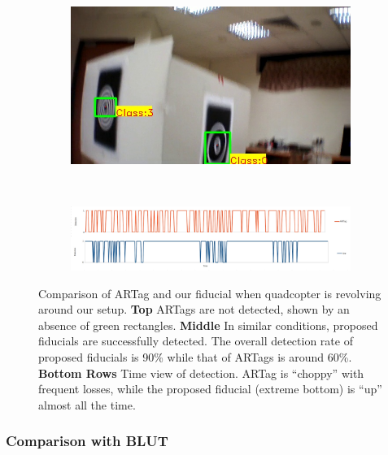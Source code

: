 \begin{figure}[hb!]
\begin{subfigure}[b]{.19\textwidth}
\end{subfigure}
\begin{subfigure}[b]{.19\textwidth}
\includegraphics[width=\linewidth]{figures/fiducial/setup_our/output_6/output_943.jpg}
\end{subfigure}\\
\begin{subfigure}[b]{\textwidth}
\includegraphics[width=\linewidth]{figures/fiducial/compare_detection.jpg}
\end{subfigure}
\caption[Comparison of ARTag and our fiducial when quadcopter is
  revolving around our setup]{Comparison of ARTag and our fiducial when quadcopter is
  revolving around our setup. 
\textbf{Top} ARTags are not detected, shown by an absence of green rectangles. \textbf{Middle} In
similar conditions, proposed fiducials are successfully
detected. The overall detection rate of proposed
fiducials is 90\% while that of ARTags is around 60\%. 
\textbf{Bottom Rows} Time view of detection. ARTag is ``choppy'' with
frequent losses, while the proposed fiducial (extreme bottom) is
``up'' almost all the 
time.}
\label{fig:setup}
\end{figure}


\subsubsection{Comparison with BLUT}

